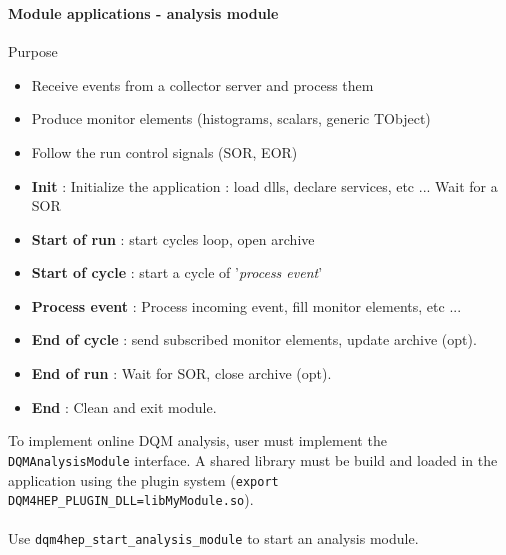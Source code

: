 \documentclass[8pt]{beamer}
\begin{document}
  \begin{frame}[containsverbatim]
    \frametitle{\secname}
    \framesubtitle{Module applications - analysis module}

    \begin{minipage}{0.78\textwidth}
      \begin{block}{Purpose}
        \begin{itemize}
          \item Receive events from a collector server and process them
          \item Produce monitor elements (histograms, scalars, generic TObject)
          \item Follow the run control signals (SOR, EOR)
        \end{itemize}
      \end{block}

      \begin{itemize}
        \item \textbf{Init} : Initialize the application : load dlls, declare services, etc ... Wait for a SOR
        \item \textbf{Start of run} : start cycles loop, open archive
        \item \textbf{Start of cycle} : start a cycle of '\textit{process event}'
        \item \textbf{Process event} : Process incoming event, fill monitor elements, etc ...
        \item \textbf{End of cycle} : send subscribed monitor elements, update archive (opt).
        \item \textbf{End of run} : Wait for SOR, close archive (opt).
        \item \textbf{End} : Clean and exit module.
      \end{itemize}
      To implement online DQM analysis, user must implement the \verb|DQMAnalysisModule| interface. A shared library must be build and loaded in the application using the plugin system (\verb|export DQM4HEP_PLUGIN_DLL=libMyModule.so|). \\
      ~ \\
      Use \verb|dqm4hep_start_analysis_module| to start an analysis module.


\end{minipage}
\end{frame}
\end{document}
